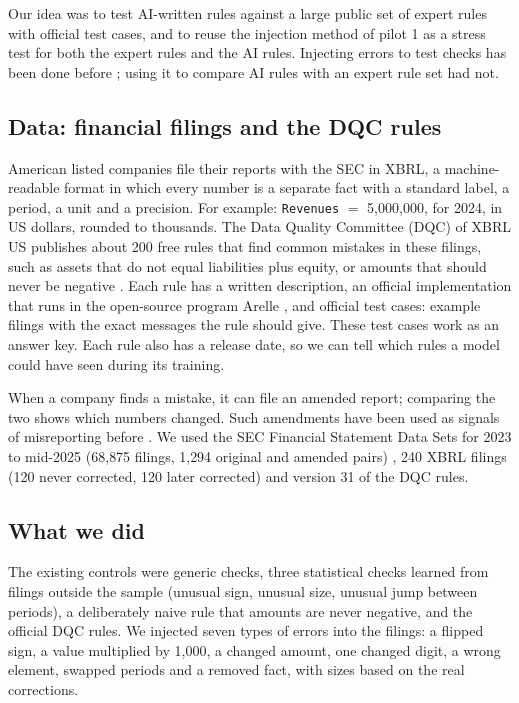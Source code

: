 \documentclass[11pt,a4paper]{article}
\begin{document}
Our idea was to test AI-written rules against a large public set of expert rules with official test cases, and to reuse the injection method of pilot 1 as a stress test for both the expert rules and the AI rules. Injecting errors to test checks has been done before \cite{homayouni,jenga}; using it to compare AI rules with an expert rule set had not.

\subsection{Data: financial filings and the DQC rules}

American listed companies file their reports with the SEC in XBRL, a machine-readable format in which every number is a separate fact with a standard label, a period, a unit and a precision. For example: \texttt{Revenues} $=$ 5{,}000{,}000, for 2024, in US dollars, rounded to thousands. The Data Quality Committee (DQC) of XBRL US publishes about 200 free rules that find common mistakes in these filings, such as assets that do not equal liabilities plus equity, or amounts that should never be negative \cite{dqc}. Each rule has a written description, an official implementation that runs in the open-source program Arelle \cite{arelle}, and official test cases: example filings with the exact messages the rule should give. These test cases work as an answer key. Each rule also has a release date, so we can tell which rules a model could have seen during its training.

When a company finds a mistake, it can file an amended report; comparing the two shows which numbers changed. Such amendments have been used as signals of misreporting before \cite{brown}. We used the SEC Financial Statement Data Sets for 2023 to mid-2025 (68{,}875 filings, 1{,}294 original and amended pairs) \cite{fsds}, 240 XBRL filings (120 never corrected, 120 later corrected) and version 31 of the DQC rules.

\subsection{What we did}

The existing controls were generic checks, three statistical checks learned from filings outside the sample (unusual sign, unusual size, unusual jump between periods), a deliberately naive rule that amounts are never negative, and the official DQC rules. We injected seven types of errors into the filings: a flipped sign, a value multiplied by 1{,}000, a changed amount, one changed digit, a wrong element, swapped periods and a removed fact, with sizes based on the real corrections.
\end{document}
